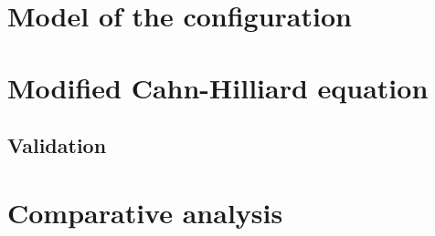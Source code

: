 \section{Model of the configuration}
\section{Modified Cahn-Hilliard equation}
\subsection{Validation}
\section{Comparative analysis}